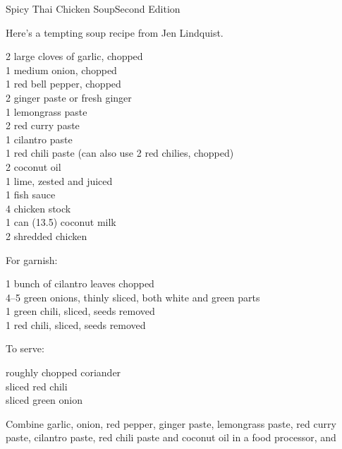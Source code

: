 
\begin{entry}{Spicy Thai Chicken Soup}{Second Edition}

\begin{open}
    Here's a tempting soup recipe from Jen Lindquist.
\end{open}
\begin{ingredients}
    2 large cloves of garlic, chopped\\
    1 medium onion, chopped\\
    1 red bell pepper, chopped\\
    \SI{2}{\tblspoon} ginger paste or fresh ginger\\
    \SI{1}{\tblspoon} lemongrass paste\\
    \SI{2}{\tblspoon} red curry paste\\
    \SI{1}{\tblspoon} cilantro paste\\
    \SI{1}{\tblspoon} red chili paste (can also use 2 red chilies, chopped)\\
    \SI{2}{\tblspoon} coconut oil\\
    1 lime, zested and juiced\\
    \SI{1}{\tblspoon} fish sauce\\
    \SI{4}{\cup} chicken stock\\
    1 can (\SI{13.5}{\fluidounce}) coconut milk\\
    \SI{2}{\cup} shredded chicken
\end{ingredients}
For garnish:
\begin{ingredients}
    1 bunch of cilantro leaves chopped\\
    \numrange{4}{5} green onions, thinly sliced, both white and green parts\\
    1 green chili, sliced, seeds removed\\
    1 red chili, sliced, seeds removed
\end{ingredients}
To serve:
\begin{ingredients}
    roughly chopped coriander\\
    sliced red chili\\
    sliced green onion
\end{ingredients}
Combine garlic, onion, red pepper, ginger paste, lemongrass paste, red curry
paste, cilantro paste, red chili paste and coconut oil in a food processor, and

\end{entry}
